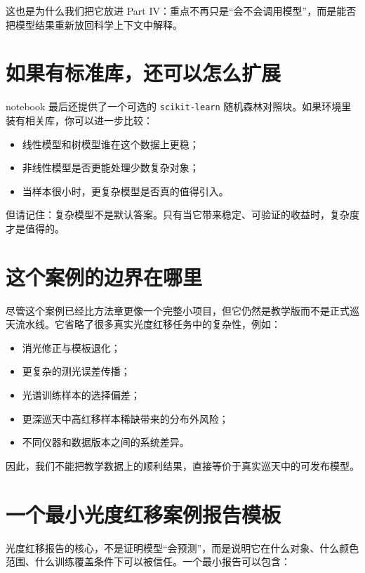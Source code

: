 这也是为什么我们把它放进 Part IV：重点不再只是“会不会调用模型”，而是能否把模型结果重新放回科学上下文中解释。

\section{如果有标准库，还可以怎么扩展}

notebook 最后还提供了一个可选的 \texttt{scikit-learn} 随机森林对照块。如果环境里装有相关库，你可以进一步比较：

\begin{itemize}
    \item 线性模型和树模型谁在这个数据上更稳；
    \item 非线性模型是否更能处理少数复杂对象；
    \item 当样本很小时，更复杂模型是否真的值得引入。
\end{itemize}

但请记住：复杂模型不是默认答案。只有当它带来稳定、可验证的收益时，复杂度才是值得的。

\section{这个案例的边界在哪里}

尽管这个案例已经比方法章更像一个完整小项目，但它仍然是教学版而不是正式巡天流水线。它省略了很多真实光度红移任务中的复杂性，例如：

\begin{itemize}
    \item 消光修正与模板退化；
    \item 更复杂的测光误差传播；
    \item 光谱训练样本的选择偏差；
    \item 更深巡天中高红移样本稀缺带来的分布外风险；
    \item 不同仪器和数据版本之间的系统差异。
\end{itemize}

因此，我们不能把教学数据上的顺利结果，直接等价于真实巡天中的可发布模型。

\section{一个最小光度红移案例报告模板}

光度红移报告的核心，不是证明模型“会预测”，而是说明它在什么对象、什么颜色范围、什么训练覆盖条件下可以被信任。一个最小报告可以包含：

